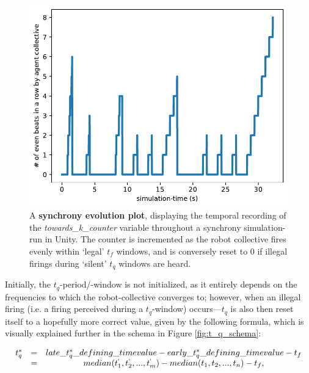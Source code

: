 	\begin{figure}[h]
		\centering
		\includegraphics[width=0.85\linewidth]{Assets/DocSegments/Chapters/Implementation/Figures/Plots/SynchronyEvolutionPlot.pdf}
		\caption[A \textbf{synchrony evolution plot}.]{A \textbf{synchrony evolution plot}, displaying the temporal recording of the \textit{towards\_k\_counter} variable throughout a synchrony simulation-run in Unity. The counter is incremented as the robot collective fires evenly within `legal' $t_f$ windows, and is conversely reset to 0 if illegal firings during `silent' $t_q$ windows are heard.}
		\label{fig:harmonic_synch_evolution}
	\end{figure}

	
	
	Initially, the $t_q$-period/-window is not initialized, as it entirely depends on the frequencies to which the robot-collective converges to; however, when an illegal firing (i.e. a firing perceived during a $t_q$-window) occurs—$t_q$ is also then reset itself to a hopefully more correct value, given by the following formula, which is visually explained further in the schema in Figure \ref{fig:t_q_schema}:

	\begin{equation}
	\label{t_q_definition}
	\begin{array}{rrclcl}
	t_q^* & = & late\_t_q^*\_defining\_timevalue - early\_t_q^*\_defining\_timevalue - t_f \\
	& = & median(t_1^`, t_2^`, ..., t_m^`) - median(t_1, t_2, ..., t_n) - t_f , \\
	\end{array}
	\end{equation}

